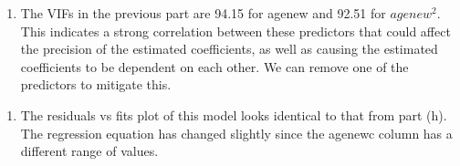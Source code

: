 \documentclass{article}
\providecommand{\tightlist}{%
      \setlength{\itemsep}{0pt}\setlength{\parskip}{0pt}}
\begin{document}
\begin{enumerate}
\def\labelenumi{\roman{enumi})}
\tightlist
\item
  The VIFs in the previous part are 94.15 for agenew and 92.51 for
  \(agenew^2\). This indicates a strong correlation between these
  predictors that could affect the precision of the estimated
  coefficients, as well as causing the estimated coefficients to be
  dependent on each other. We can remove one of the predictors to
  mitigate this.
\end{enumerate}

\begin{enumerate}
\def\labelenumi{\alph{enumi})}
\setcounter{enumi}{9}
\tightlist
\item
  The residuals vs fits plot of this model looks identical to that from
  part (h). The regression equation has changed slightly since the
  agenewc column has a different range of values.
  
\begin{figure}[!h]
  \begin{floatrow}
  \end{floatrow}
\end{figure}
\end{enumerate}
\end{document}
